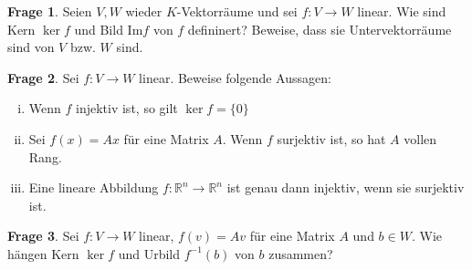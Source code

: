 \documentclass{scrartcl}
\theoremstyle{definition}
\newtheorem{frage}{Frage}[section]
\newcommand{\R}{\mathbb R}
\renewcommand{\Im}{\mathrm{Im}}
\begin{document}
\begin{frage}
Seien $V, W$ wieder $K$-Vektorräume und sei $f\colon V \to W$ linear. Wie sind Kern $\ker f$ und Bild $\Im f$ von $f$ defininert? Beweise, dass sie Untervektorräume sind von $V$ bzw. $W$ sind.
\end{frage}

\begin{frage} Sei $f\colon V \to W$ linear.
Beweise folgende Aussagen:
\begin{enumerate}[(i)]
\item Wenn $f$ injektiv ist, so gilt $\ker f = \{ 0 \}$
\item Sei $f(x) = Ax$ für eine Matrix $A$. Wenn $f$ surjektiv ist, so hat $A$ vollen Rang.
\item Eine lineare Abbildung $f\colon \R^n \to \R^n$ ist genau dann injektiv, wenn sie surjektiv ist.
\end{enumerate}
\end{frage}

\begin{frage}
Sei $f\colon V \to W$ linear, $f(v) = Av$ für eine Matrix $A$ und $b \in W$. Wie hängen Kern $\ker f$ und Urbild $f^{-1}(b)$ von $b$ zusammen? 
\end{frage}
\end{document}
